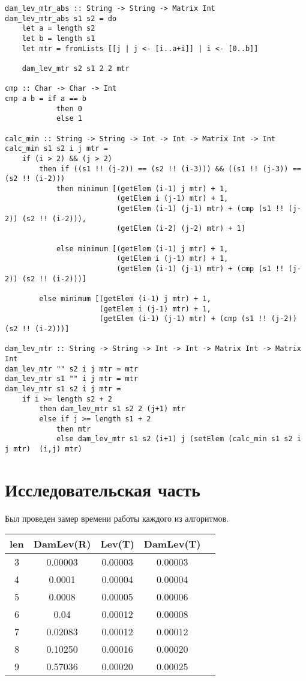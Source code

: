 \documentclass[12pt]{report}
\begin{document}
\begin{lstlisting}[label=some-code,caption=Функция нахождения расстояния Дамерау-Левенштейна матрично]
dam_lev_mtr_abs :: String -> String -> Matrix Int
dam_lev_mtr_abs s1 s2 = do
    let a = length s2
    let b = length s1
    let mtr = fromLists [[j | j <- [i..a+i]] | i <- [0..b]]
    
    dam_lev_mtr s2 s1 2 2 mtr

cmp :: Char -> Char -> Int
cmp a b = if a == b
            then 0
            else 1

calc_min :: String -> String -> Int -> Int -> Matrix Int -> Int
calc_min s1 s2 i j mtr = 
    if (i > 2) && (j > 2)
        then if ((s1 !! (j-2)) == (s2 !! (i-3))) && ((s1 !! (j-3)) == (s2 !! (i-2)))
            then minimum [(getElem (i-1) j mtr) + 1, 
                          (getElem i (j-1) mtr) + 1,
                          (getElem (i-1) (j-1) mtr) + (cmp (s1 !! (j-2)) (s2 !! (i-2))),
                          (getElem (i-2) (j-2) mtr) + 1]
                          
            else minimum [(getElem (i-1) j mtr) + 1, 
                          (getElem i (j-1) mtr) + 1,
                          (getElem (i-1) (j-1) mtr) + (cmp (s1 !! (j-2)) (s2 !! (i-2)))]
                          
        else minimum [(getElem (i-1) j mtr) + 1, 
                      (getElem i (j-1) mtr) + 1,
                      (getElem (i-1) (j-1) mtr) + (cmp (s1 !! (j-2)) (s2 !! (i-2)))]

dam_lev_mtr :: String -> String -> Int -> Int -> Matrix Int -> Matrix Int
dam_lev_mtr "" s2 i j mtr = mtr
dam_lev_mtr s1 "" i j mtr = mtr
dam_lev_mtr s1 s2 i j mtr = 
    if i >= length s2 + 2
        then dam_lev_mtr s1 s2 2 (j+1) mtr
        else if j >= length s1 + 2
            then mtr
            else dam_lev_mtr s1 s2 (i+1) j (setElem (calc_min s1 s2 i j mtr)  (i,j) mtr)
\end{lstlisting}

\chapter{Исследовательская часть}
Был проведен замер времени работы каждого из алгоритмов.

\begin{center}
	\begin{tabular}{|c c c c c|} 
 	\hline
	len & DamLev(R) & Lev(T) & DamLev(T) \\ [0.5ex] 
 	\hline\hline
 	3 &  0.00003 & 0.00003 & 0.00003\\
 	\hline
 	4 &  0.0001   & 0.00004 & 0.00004\\
 	\hline
	5 &  0.0008   & 0.00005 & 0.00006\\
	\hline
	6 &  0.04       & 0.00012 & 0.00008\\
	\hline
	7 &  0.02083 & 0.00012 & 0.00012\\
	\hline
	8 &  0.10250 & 0.00016 & 0.00020\\
	\hline
	9 &  0.57036 & 0.00020 & 0.00025\\
	\hline
	\end{tabular}
\end{center}
\end{document}
